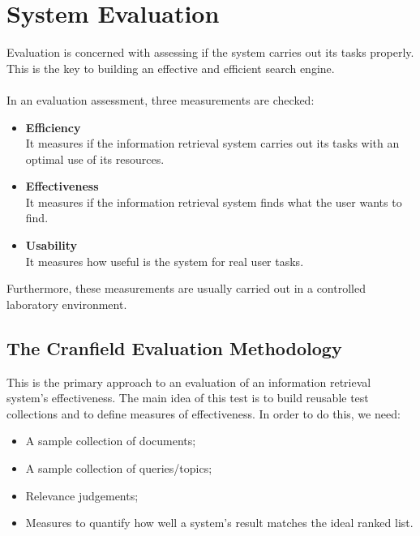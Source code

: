 \documentclass{article}
\begin{document}
\section{System Evaluation}
Evaluation is concerned with assessing if the system carries out its tasks properly. This is the key to building an effective and efficient search engine. \\ \\
In an evaluation assessment, three measurements are checked:

\begin{itemize}
	\item \textbf{Efficiency}
	\vspace{.2cm} \\
	It measures if the information retrieval system carries out its tasks with an optimal use of its resources.
	
	\item \textbf{Effectiveness}
	\vspace{.2cm} \\
	It measures if the information retrieval system finds what the user wants to find.
	
	\item \textbf{Usability}
	\vspace{.2cm} \\
	It measures how useful is the system for real user tasks.
\end{itemize}
Furthermore, these measurements are usually carried out in a controlled laboratory environment.

\subsection{The Cranfield Evaluation Methodology}
This is the primary approach to an evaluation of an information retrieval system's effectiveness. The main idea of this test is to build reusable test collections and to define measures of effectiveness. In order to do this, we need:

\begin{itemize}
	\item A sample collection of documents;
	\item A sample collection of queries/topics;
	\item Relevance judgements;
	\item Measures to quantify how well a system's result matches the ideal ranked list.
\end{itemize}
\end{document}
